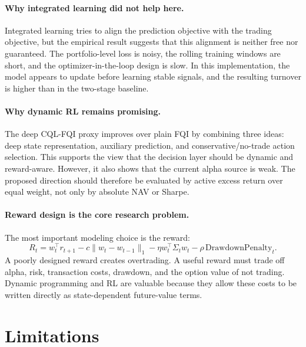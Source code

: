 \documentclass[11pt]{article}
\begin{document}
\paragraph{Why integrated learning did not help here.}
Integrated learning tries to align the prediction objective with the trading objective, but the empirical result suggests that this alignment is neither free nor guaranteed. The portfolio-level loss is noisy, the rolling training windows are short, and the optimizer-in-the-loop design is slow. In this implementation, the model appears to update before learning stable signals, and the resulting turnover is higher than in the two-stage baseline.

\paragraph{Why dynamic RL remains promising.}
The deep CQL-FQI proxy improves over plain FQI by combining three ideas: deep state representation, auxiliary prediction, and conservative/no-trade action selection. This supports the view that the decision layer should be dynamic and reward-aware. However, it also shows that the current alpha source is weak. The proposed direction should therefore be evaluated by active excess return over equal weight, not only by absolute NAV or Sharpe.

\paragraph{Reward design is the core research problem.}
The most important modeling choice is the reward:
\[
R_t =
w_t^\top r_{t+1}
-
c\|w_t-w_{t-1}\|_1
-
\eta w_t^\top \Sigma_t w_t
-
\rho\,\mathrm{DrawdownPenalty}_t.
\]
A poorly designed reward creates overtrading. A useful reward must trade off alpha, risk, transaction costs, drawdown, and the option value of not trading. Dynamic programming and RL are valuable because they allow these costs to be written directly as state-dependent future-value terms.

\section{Limitations}
\end{document}

